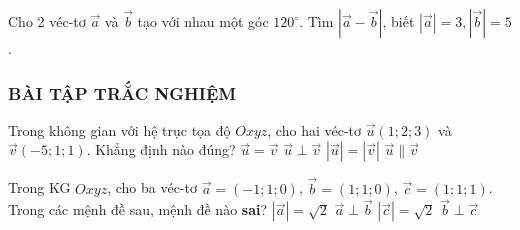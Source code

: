 \begin{vd}%
	Cho 2 véc-tơ $\overrightarrow{a}$ và $\overrightarrow{b}$ tạo với nhau một góc $120^\circ$. Tìm $\left|\overrightarrow{a}-\overrightarrow{b}\right|$, biết $|\overrightarrow{a}|=3,\left|\overrightarrow{b}\right|=5$.
\end{vd}
\subsubsection{BÀI TẬP TRẮC NGHIỆM}
\begin{ex}%
	Trong không gian với hệ trục tọa độ $Oxyz$, cho hai véc-tơ $\vec{u}\left(1;2;3\right)$ và $\vec{v}\left(-5;1;1\right)$. Khẳng định nào đúng?
	\choice
	{$\vec{u}=\vec{v}$}
	{\True $\vec{u}\perp \vec{v}$}
	{$\left| \vec{u}\right|=\left| \vec{v}\right|$}
	{$\vec{u}\parallel\vec{v}$}
\end{ex}
\begin{ex}%
	Trong KG $Oxyz$, cho ba véc-tơ $ \overrightarrow{a}=(-1;1;0) $, $  \overrightarrow{b}=(1;1;0) $, $ \overrightarrow{c}=(1;1;1) $. Trong các mệnh đề sau, mệnh đề nào \textbf{sai}?
	\choice
	{$\left|\overrightarrow{a}\right| = \sqrt{2} $}
	{$ \overrightarrow{a} \perp \overrightarrow{b} $}
	{$ \left|\overrightarrow{c}\right| = \sqrt{2}$}
	{\True $ \overrightarrow{b} \perp \overrightarrow{c} $}
\end{ex}
